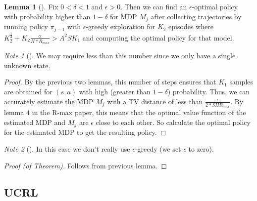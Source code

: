 \documentclass[12pt, letterpaper]{article}
\theoremstyle{definition}
\newtheorem*{lemma}{Lemma}
\theoremstyle{remark}
\newtheorem*{note}{Note}
\begin{document}
\begin{lemma}[]
    Fix \(0 < \delta < 1\) and \(\epsilon > 0\). Then we can find an \(\epsilon\)-optimal policy with probability higher than \(1-\delta\) for MDP \(M_j\) after collecting trajectories by running policy \(\pi_{j-1}\) with \(\epsilon\)-greedy exploration for \(K_2\) episodes where \(K_2^{\frac{1}{3}} + K_2 \frac{\alpha}{H*R_{max}} > A^2 S K_1\) and computing the optimal policy for that model.
\end{lemma}

\begin{note}[]
    We may require less than this number since we only have a single unknown state.
\end{note}

\begin{proof}[Proof]
    By the previous two lemmas, this number of steps ensures that \(K_1\) samples are obtained for \((s, a)\) with high (greater than \(1-\delta\)) probability. Thus, we can accurately estimate the MDP \(M_j\) with a TV distance of less than \(\frac{\epsilon}{2*SHR_{max}}\). By lemma 4 in the R-max paper, this means that the optimal value function of the estimated MDP and \(M_j\) are \(\epsilon\) close to each other. So calculate the optimal policy for the estimated MDP to get the resulting policy.
\end{proof}

\begin{note}[]
    In this case we don't really use \(\epsilon\)-greedy (we set \(\epsilon\) to zero).
\end{note}

\begin{proof}[Proof (of Theorem)]
    Follows from previous lemma.
\end{proof}

\subsection{UCRL}
\end{document}
